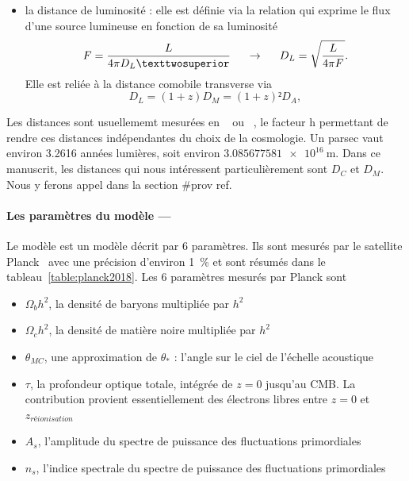 \documentclass[11pt, twoside, a4paper, openright]{report}
\begin{document}
\begin{itemize}[label=$\bullet$]
\item la distance de luminosité : elle est définie via la relation qui exprime le flux d'une source lumineuse en fonction de sa luminosité
  \begin{equation}
    \label{eq:dist_lum}
    F = \frac{L}{4\pi D_L²} \hspace{0.5cm} \rightarrow \hspace{0.5cm} D_L = \sqrt{\frac{L}{4 \pi F}} .
  \end{equation}
  Elle est reliée à la distance comobile transverse via
  \begin{equation}
    D_L = (1+z) D_M = (1+z)² D_A ,
  \end{equation}
\end{itemize}
Les distances sont usuellememt mesurées en \si{\perh\kpc} ou \si{\perh\Mpc}, le facteur $\mathrm{h}$ permettant de rendre ces distances indépendantes du choix de la cosmologie. Un parsec vaut environ \num{3.2616} années lumières, soit environ $\SI{3,085 677 581 e16}{\meter}$.
Dans ce manuscrit, les distances qui nous intéressent particulièrement sont $D_C$ et $D_M$. Nous y ferons appel dans la section \#prov ref.

\paragraph{Les paramètres du modèle —} 
Le modèle \lcdm{} est un modèle décrit par 6 paramètres. Ils sont mesurés par le satellite Planck~\cite{CITE ref} avec une précision d'environ 1~\% et sont résumés dans le tableau~\ref{table:planck2018}. Les 6 paramètres mesurés par Planck sont
\begin{itemize}
\item $\Omega_bh^2$, la densité de baryons multipliée par $h^2$
\item $\Omega_ch^2$, la densité de matière noire multipliée par $h^2$
\item $\theta_{MC}$, une approximation de $\theta_*$ : l'angle sur le ciel de l'échelle acoustique
\item $\tau$, la profondeur optique totale, intégrée de $z=0$ jusqu'au CMB. La contribution provient essentiellement des électrons libres entre $z = 0$ et $z_{réionisation}$
\item $A_s$, l'amplitude du spectre de puissance des fluctuations primordiales 
\item $n_s$, l'indice spectrale du spectre de puissance des fluctuations primordiales
\end{itemize}
\end{document}
